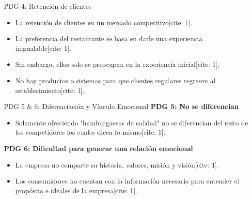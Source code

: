 \begin{frame}{PDG 4: Retención de clientes}
  \vspace{1.5cm}
  \begin{itemize}
    \item La retención de clientes en un mercado competitivo[cite: 1].
    \item La preferencia del restaurante se basa en darle una experiencia inigualable[cite: 1].
    \item Sin embargo, ellos solo se preocupan en la experiencia inicial[cite: 1].
    \item No hay productos o sistemas para que clientes regulares regresen al establecimiento[cite: 1].
  \end{itemize}
\end{frame}

\begin{frame}{PDG 5 \& 6: Diferenciación y Vínculo Emocional}
  \vspace{1.5cm}
  \textbf{PDG 5: No se diferencian}
  \begin{itemize}
    \item Solamente ofreciendo "hamburguesas de calidad" no se diferencian del resto de los competidores los cuales dicen lo mismo[cite: 1].
  \end{itemize}

  \vspace{0.5cm}
  \textbf{PDG 6: Dificultad para generar una relación emocional}
  \begin{itemize}
    \item La empresa no comparte su historia, valores, misión y visión[cite: 1].
    \item Los consumidores no cuentan con la información necesaria para entender el propósito e ideales de la empresa[cite: 1].
  \end{itemize}
\end{frame}
